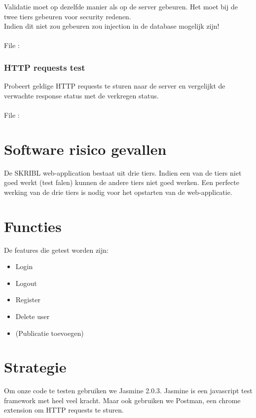 \documentclass{article}
\begin{document}
Validatie moet op dezelfde manier als op de server gebeuren. Het moet bij de twee tiers gebeuren voor security redenen.
\\
Indien dit niet zou gebeuren zou injection in de database mogelijk zijn!
\\
\\
File : %

\subsubsection{HTTP requests test}
Probeert geldige HTTP requests te sturen naar de server en vergelijkt de verwachte response status met de verkregen status. 
\\
\\
File : %

\section{Software risico gevallen}
De SKRIBL web-application bestaat uit drie tiers. Indien een van de tiers niet goed werkt (test falen) kunnen de andere tiers niet goed werken. Een perfecte werking van de drie tiers is nodig voor het opstarten van de web-applicatie.

\section{Functies}
De features die getest worden zijn:
\begin{itemize}
  \item Login 
  \item Logout 
  \item Register
  \item Delete user
  \item (Publicatie toevoegen) 
\end{itemize}

\section{Strategie}
Om onze code te testen gebruiken we Jasmine 2.0.3. Jasmine is een javascript test framework met heel veel kracht. Maar ook gebruiken we Postman, een chrome extension om HTTP requests te sturen.
\end{document}
